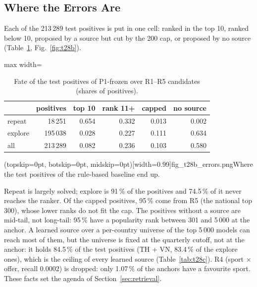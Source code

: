 \documentclass{ieeeaccess}
\begin{document}
\subsection{Where the Errors Are}
Each of the 213\,289 test positives is put in one cell: ranked in the top 10, ranked below 10, proposed by a source but cut by the
200 cap, or proposed by no source (Table~\ref{tab:t28b}, Fig.~\ref{fig:t28b}).

\begin{table}[t]
\caption{Fate of the test positives of P1-frozen over R1--R5 candidates (shares of positives).}
\label{tab:t28b}
\setlength{\tabcolsep}{4pt}
\centering
\begin{adjustbox}{max width=\columnwidth}
\begin{tabular}{lrrrrr}
\toprule
 & positives & top 10 & rank 11+ & capped & no source \\
\midrule
repeat  & 18\,251  & 0.654 & 0.332 & 0.013 & 0.002 \\
explore & 195\,038 & 0.028 & 0.227 & 0.111 & 0.634 \\
all     & 213\,289 & 0.082 & 0.236 & 0.103 & 0.580 \\
\bottomrule
\end{tabular}
\end{adjustbox}
\end{table}

\Figure[t!](topskip=0pt, botskip=0pt, midskip=0pt)[width=0.99\columnwidth]{fig_t28b_errors.png}{Where the test positives of the rule-based baseline end up.\label{fig:t28b}}

Repeat is largely solved; explore is 91\,\% of the positives and 74.5\,\% of it never reaches the ranker. Of the capped positives,
95\,\% come from R5 (the national top 300), whose lower ranks do not fit the cap. The positives without a source are mid-tail, not
long-tail: 95\,\% have a popularity rank between 301 and 5\,000 at the anchor. A learned source over a per-country universe of the
top 5\,000 models can reach most of them, but the universe is fixed at the quarterly cutoff, not at the anchor: it holds 84.5\,\% of
the test positives (TH + VN, 83.4\,\% of the explore ones), which is the ceiling of every learned source (Table~\ref{tab:t28c}). R4 (sport $\times$ offer, recall 0.0002) is dropped:
only 1.07\,\% of the anchors have a favourite sport. These facts set the agenda of Section~\ref{sec:retrieval}.

\end{document}
